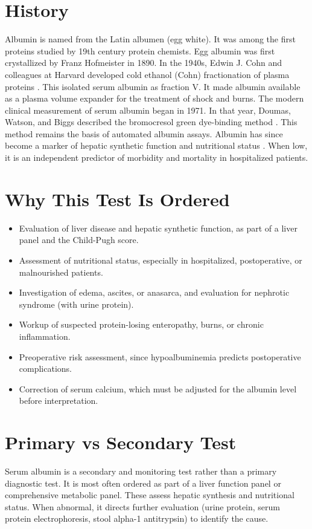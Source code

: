 \section*{History}
Albumin is named from the Latin albumen (egg white). It was among the first proteins studied by 19th century protein chemists. Egg albumin was first crystallized by Franz Hofmeister in 1890. In the 1940s, Edwin J. Cohn and colleagues at Harvard developed cold ethanol (Cohn) fractionation of plasma proteins \cite{peters1996all}. This isolated serum albumin as fraction V. It made albumin available as a plasma volume expander for the treatment of shock and burns. The modern clinical measurement of serum albumin began in 1971. In that year, Doumas, Watson, and Biggs described the bromocresol green dye-binding method \cite{doumas1971albumin}. This method remains the basis of automated albumin assays. Albumin has since become a marker of hepatic synthetic function and nutritional status \cite{vincent2003hypoalbuminemia}. When low, it is an independent predictor of morbidity and mortality in hospitalized patients.
\section*{Why This Test Is Ordered}
\begin{itemize}
  \item Evaluation of liver disease and hepatic synthetic function, as part of a liver panel and the Child-Pugh score.
  \item Assessment of nutritional status, especially in hospitalized, postoperative, or malnourished patients.
  \item Investigation of edema, ascites, or anasarca, and evaluation for nephrotic syndrome (with urine protein).
  \item Workup of suspected protein-losing enteropathy, burns, or chronic inflammation.
  \item Preoperative risk assessment, since hypoalbuminemia predicts postoperative complications.
  \item Correction of serum calcium, which must be adjusted for the albumin level before interpretation.
\end{itemize}
\section*{Primary vs Secondary Test}
Serum albumin is a secondary and monitoring test rather than a primary diagnostic test. It is most often ordered as part of a liver function panel or comprehensive metabolic panel. These assess hepatic synthesis and nutritional status. When abnormal, it directs further evaluation (urine protein, serum protein electrophoresis, stool alpha-1 antitrypsin) to identify the cause.
